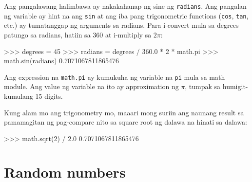 \documentclass[10pt,]{book}
\newenvironment{Shaded}{}{}
\newcommand{\DecValTok}[1]{\textcolor[rgb]{0.25,0.63,0.44}{#1}}
\newcommand{\FloatTok}[1]{\textcolor[rgb]{0.25,0.63,0.44}{#1}}
\newcommand{\NormalTok}[1]{#1}
\newcommand{\OperatorTok}[1]{\textcolor[rgb]{0.40,0.40,0.40}{#1}}
\begin{document}
  
 

Ang pangalawang halimbawa ay nakakahanap ng sine ng \texttt{radians}.
Ang pangalan ng variable ay hint na ang \texttt{sin} at ang iba pang
trigonometric functions (\texttt{cos}, \texttt{tan}, etc.) ay
tumatanggap ng arguments sa radians. Para i-convert mula sa degrees
patungo sa radians, hatiin sa 360 at i-multiply sa \(2
\pi\):

\begin{Shaded}
\begin{Highlighting}[]
\OperatorTok{\textgreater{}\textgreater{}\textgreater{}}\NormalTok{ degrees }\OperatorTok{=} \DecValTok{45}
\OperatorTok{\textgreater{}\textgreater{}\textgreater{}}\NormalTok{ radians }\OperatorTok{=}\NormalTok{ degrees }\OperatorTok{/} \FloatTok{360.0} \OperatorTok{*} \DecValTok{2} \OperatorTok{*}\NormalTok{ math.pi}
\OperatorTok{\textgreater{}\textgreater{}\textgreater{}}\NormalTok{ math.sin(radians)}
\FloatTok{0.7071067811865476}
\end{Highlighting}
\end{Shaded}

Ang expression na \texttt{math.pi} ay kumukuha ng variable na
\texttt{pi} mula sa math module. Ang value ng variable na ito ay
approximation ng \(\pi\), tumpak sa humigit-kumulang 15 digits.


Kung alam mo ang trigonometry mo, maaari mong suriin ang naunang result
sa pamamagitan ng pag-compare nito sa square root ng dalawa na hinati sa
dalawa:

 

\begin{Shaded}
\begin{Highlighting}[]
\OperatorTok{\textgreater{}\textgreater{}\textgreater{}}\NormalTok{ math.sqrt(}\DecValTok{2}\NormalTok{) }\OperatorTok{/} \FloatTok{2.0}
\FloatTok{0.7071067811865476}
\end{Highlighting}
\end{Shaded}

\section{Random numbers}\label{random-numbers}

  
\end{document}
